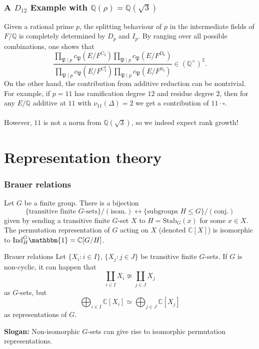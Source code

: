 \documentclass{beamer}
\newcommand{\trivial}{\mathbbm{1}}
\newcommand{\Ind}{\mathrm{Ind}}
\newcommand{\Stab}{\mathrm{Stab}}
\newcommand{\QQss}{(\QQ^{\times})^2}
\newcommand{\PP}{\mathfrak{P}}
\newcommand{\QQ}{\mathbb{Q}}
\newcommand{\bC}{\mathbb{C}}
\theoremstyle{plain}
\begin{document}
\begin{frame}
    \frametitle{A $D_{12}$ Example with $\QQ(\rho)=\QQ(\sqrt{3})$}
    Given a rational prime $p$, the splitting behaviour of $p$ in the intermediate fields of $F/\QQ$ is completely determined by $D_p$ and $I_p$. \pause By ranging over all possible combinations, one shows that 
    $$\frac{\prod_{\PP\mid p}c_\PP(E/F^{C_2})\prod_{\PP\mid p}c_\PP(E/F^{D_6})}{\prod_{\PP\mid p}c_\PP(E/F^{C_2^2})\prod_{\PP\mid p}c_\PP(E/F^{S_3})}\in\QQss.$$
    \pause On the other hand, the contribution from additive reduction can be nontrivial. \pause For example, if $p=11$ has ramification degree $12$ and residue degree $2$, then for any $E/\QQ$ additive at $11$ with $\nu_{11}(\Delta)=2$ we get a contribution of $11\cdot\square$. \pause
    \\~\\
    However, $11$ is not a norm from $\QQ(\sqrt{3})$, so we indeed expect rank growth!
\end{frame}

\section*{Representation theory}
\frame{\sectionpage}


\begin{frame}
    \frametitle{Brauer relations}
    Let $G$ be a finite group. \pause There is a bijection 
    \[ \{ \text{transitive finite } G \text{-sets}\}/(\text{isom.})\leftrightarrow \{ \text{subgroups } H \leq G \}/(\text{conj.})\] 
    given by sending a transitive finite $G$-set $X$ to $H = \Stab_{G} (x)$ for some $x \in X$. \pause The permutation representation of $G$ acting on $X$ (denoted $\bC[X]$) is isomorphic to $\Ind_{H}^G \trivial  = \bC[G / H]$. 
\end{frame}

\begin{frame}{Brauer relations}
    Let $\{ X_i \colon i \in I\}$, $\{X_j \colon j \in J \}$ be transitive finite $G$-sets. If $G$ is non-cyclic, it can happen that
    \[ \coprod_{i \in I} X_i \not\simeq \coprod_{j \in J} X_j  \]
    as $G$-sets, but \pause 
    \[ \bigoplus_{i \in I}\bC[ X_i] \simeq \bigoplus_{j \in J} \bC[ X_j]\] 
    as representations of $G$. \pause

    \textbf{Slogan:} Non-isomorphic $G$-sets can give rise to isomorphic permutation representations.

\end{frame}
\end{document}
